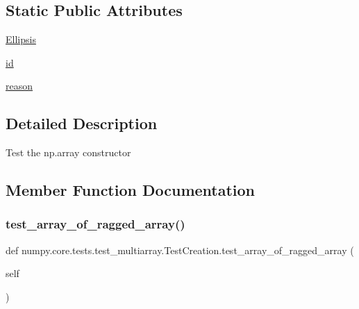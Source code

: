 \subsection*{Static Public Attributes}
\begin{DoxyCompactItemize}
\item 
\hyperlink{classnumpy_1_1core_1_1tests_1_1test__multiarray_1_1TestCreation_a897bfbc6597f605dba61660f1c8b69e9}{Ellipsis}
\item 
\hyperlink{classnumpy_1_1core_1_1tests_1_1test__multiarray_1_1TestCreation_aa2f8fa4d6df1f5d49b7dc8c3d2771be5}{id}
\item 
\hyperlink{classnumpy_1_1core_1_1tests_1_1test__multiarray_1_1TestCreation_a61787cc3baf26126999cb79d9080cebe}{reason}
\end{DoxyCompactItemize}


\subsection{Detailed Description}
\begin{DoxyVerb}Test the np.array constructor
\end{DoxyVerb}
 

\subsection{Member Function Documentation}
\mbox{\label{classnumpy_1_1core_1_1tests_1_1test__multiarray_1_1TestCreation_ae24bee6fd6e745a797044a5a8664ca4b}} 
\subsubsection{\texorpdfstring{test\+\_\+array\+\_\+of\+\_\+ragged\+\_\+array()}{test\_array\_of\_ragged\_array()}}
{\footnotesize\ttfamily def numpy.\+core.\+tests.\+test\+\_\+multiarray.\+Test\+Creation.\+test\+\_\+array\+\_\+of\+\_\+ragged\+\_\+array (\begin{DoxyParamCaption}\item[{}]{self }\end{DoxyParamCaption})}

